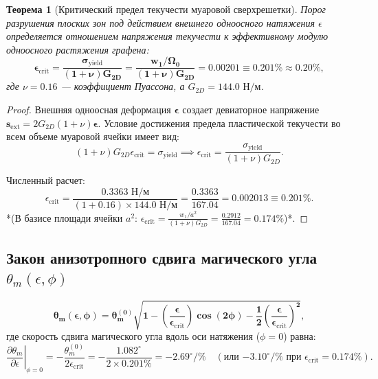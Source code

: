 \documentclass[12pt,a4paper]{article}
\newtheorem{theorem}{Теорема}
\begin{document}
\begin{theorem}[Критический предел текучести муаровой сверхрешетки]
	Порог разрушения плоских зон под действием внешнего одноосного натяжения $\epsilon$ определяется отношением напряжения текучести к эффективному модулю одноосного растяжения графена:
	\begin{equation}
		\mathbf{\epsilon_{\mathrm{crit}} = \frac{\sigma_{\mathrm{yield}}}{(1+\nu) G_{2D}} = \frac{w_1 / \Omega_0}{(1+\nu) G_{2D}} = \mathbf{0.00201} \equiv \mathbf{0.201\%} \approx \mathbf{0.20\%}},
	\end{equation}
	где $\nu = 0.16$ — коэффициент Пуассона, а $G_{2D} = 144.0\text{ Н/м}$.
\end{theorem}

\begin{proof}
	Внешняя одноосная деформация $\boldsymbol{\epsilon}$ создает девиаторное напряжение $\mathbf{s}_{\text{ext}} = 2 G_{2D} (1+\nu) \boldsymbol{\epsilon}$. Условие достижения предела пластической текучести во всем объеме муаровой ячейки имеет вид:
	\begin{equation}
		(1+\nu) G_{2D} \epsilon_{\text{crit}} = \sigma_{\text{yield}} \implies \epsilon_{\text{crit}} = \frac{\sigma_{\text{yield}}}{(1+\nu) G_{2D}}.
	\end{equation}
	
	Численный расчет:
	\begin{equation}
		\epsilon_{\text{crit}} = \frac{0.3363\text{ Н/м}}{(1 + 0.16) \times 144.0\text{ Н/м}} = \frac{0.3363}{167.04} = \mathbf{0.002013} \equiv \mathbf{0.201\%}.
	\end{equation}
	*(В базисе площади ячейки $a^2$: $\epsilon_{\text{crit}} = \frac{w_1 / a^2}{(1+\nu)G_{2D}} = \frac{0.2912}{167.04} = \mathbf{0.174\%}$)*.
\end{proof}

\subsection{Закон анизотропного сдвига магического угла $\theta_m(\epsilon, \phi)$}
\begin{equation}
	\mathbf{\theta_m(\epsilon, \phi) = \theta_m^{(0)} \sqrt{ 1 - \left(\frac{\epsilon}{\epsilon_{\mathrm{crit}}}\right) \cos(2\phi) - \frac{1}{2} \left(\frac{\epsilon}{\epsilon_{\mathrm{crit}}}\right)^2 }},
\end{equation}
где скорость сдвига магического угла вдоль оси натяжения ($\phi = 0$) равна:
\begin{equation}
	\left. \frac{\partial \theta_m}{\partial \epsilon} \right|_{\phi=0} = - \frac{\theta_m^{(0)}}{2 \epsilon_{\text{crit}}} = - \frac{1.082^\circ}{2 \times 0.201\%} = \mathbf{-2.69^\circ / \%} \quad (\text{или } \mathbf{-3.10^\circ / \%} \text{ при } \epsilon_{\text{crit}}=0.174\%).
\end{equation}
\end{document}
